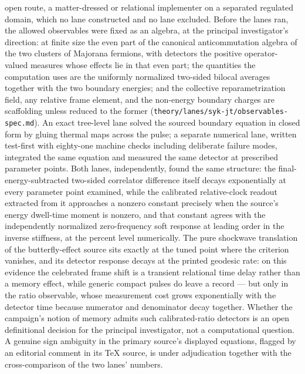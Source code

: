open route, a matter-dressed or relational implementer on a separated
regulated domain, which no lane constructed and no lane excluded. Before the lanes ran, the
allowed observables were fixed as an algebra, at the principal
investigator's direction: at finite size the even part of the canonical
anticommutation algebra of the two clusters of Majorana fermions, with
detectors the positive operator-valued measures whose effects lie in that
even part; the quantities the computation uses are the uniformly normalized
two-sided bilocal averages together with the two boundary energies; and the
collective reparametrization field, any relative frame element, and the
non-energy boundary charges are scaffolding unless reduced to the former
(\texttt{theory/lanes/syk-jt/observables-spec.md}). An exact tree-level
lane solved the sourced boundary equation in closed form by gluing thermal
maps across the pulse; a separate numerical lane, written test-first with
eighty-one machine checks including deliberate failure modes, integrated
the same equation and measured the same detector at prescribed parameter
points. Both lanes, independently, found the same structure: the
final-energy-subtracted two-sided correlator difference itself decays
exponentially at every parameter point examined, while the calibrated
relative-clock readout extracted from it approaches a nonzero constant
precisely when the source's energy dwell-time moment is nonzero, and that
constant agrees with the independently normalized zero-frequency soft
response at leading order in the inverse stiffness, at the percent level
numerically. The pure shockwave translation of the butterfly-effect source
sits exactly at the tuned point where the criterion vanishes, and its
detector response decays at the printed geodesic rate: on this evidence the
celebrated frame shift is a transient relational time delay rather than a
memory effect, while generic compact pulses do leave a record --- but only
in the ratio observable, whose measurement cost grows exponentially with
the detector time because numerator and denominator decay together.
Whether the campaign's notion of memory admits such calibrated-ratio
detectors is an open definitional decision for the principal investigator,
not a computational question. A genuine sign ambiguity in the primary
source's displayed equations, flagged by an editorial comment in its \TeX{}
source, is under adjudication together with the cross-comparison of the two
lanes' numbers.


